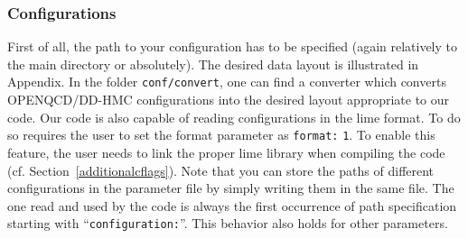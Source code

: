 \documentclass[a4paper,12pt]{scrartcl}
\begin{document}
\subsubsection{Configurations}
First of all, the path to your configuration has to be specified (again relatively to the main directory or absolutely).  The desired data layout is illustrated in Appendix. In the folder \texttt{conf/convert}, one can find a converter which converts OPENQCD/DD-HMC configurations into the desired layout appropriate to our code.  Our code is also capable of reading configurations in the lime format.  To do so requires the user to set the format parameter as \texttt{format:} \texttt{1}.  To enable this feature, the user needs to link the proper lime library when compiling the code (cf. Section~\ref{additionalcflags}). 
Note that you can store the paths of different configurations in the parameter file by simply writing them in the same file.   The one  read and used by the code is always the first occurrence of path specification starting with ``\texttt{configuration:}''.  This behavior also holds for other parameters. 
\end{document}

